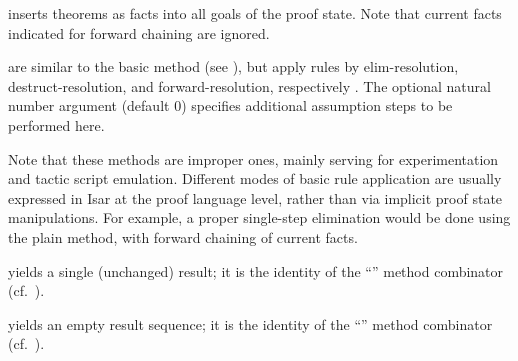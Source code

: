 \begin{isabellebody}
\begin{isamarkuptext}
\begin{descr}
  \item [\hyperlink{method.insert}{\mbox{\isa{insert}}}~\isa{{\isachardoublequote}a\isactrlsub {\isadigit{1}}\ {\isasymdots}\ a\isactrlsub n{\isachardoublequote}}] inserts
  theorems as facts into all goals of the proof state.  Note that
  current facts indicated for forward chaining are ignored.

  \item [\hyperlink{method.erule}{\mbox{\isa{erule}}}~\isa{{\isachardoublequote}a\isactrlsub {\isadigit{1}}\ {\isasymdots}\ a\isactrlsub n{\isachardoublequote}}, \hyperlink{method.drule}{\mbox{\isa{drule}}}~\isa{{\isachardoublequote}a\isactrlsub {\isadigit{1}}\ {\isasymdots}\ a\isactrlsub n{\isachardoublequote}}, and \hyperlink{method.frule}{\mbox{\isa{frule}}}~\isa{{\isachardoublequote}a\isactrlsub {\isadigit{1}}\ {\isasymdots}\ a\isactrlsub n{\isachardoublequote}}] are similar to the basic \hyperlink{method.rule}{\mbox{}}
  method (see ), but apply rules by
  elim-resolution, destruct-resolution, and forward-resolution,
  respectively \cite{isabelle-ref}.  The optional natural number
  argument (default 0) specifies additional assumption steps to be
  performed here.

  Note that these methods are improper ones, mainly serving for
  experimentation and tactic script emulation.  Different modes of
  basic rule application are usually expressed in Isar at the proof
  language level, rather than via implicit proof state manipulations.
  For example, a proper single-step elimination would be done using
  the plain \hyperlink{method.rule}{\mbox{}} method, with forward chaining of current
  facts.

  \item [\hyperlink{method.succeed}{\mbox{\isa{succeed}}}] yields a single (unchanged) result; it is
  the identity of the ``\isa{{\isachardoublequote}{\isacharcomma}{\isachardoublequote}}'' method combinator (cf.\
  ).

  \item [\hyperlink{method.fail}{\mbox{\isa{fail}}}] yields an empty result sequence; it is the
  identity of the ``\isa{{\isachardoublequote}{\isacharbar}{\isachardoublequote}}'' method combinator (cf.\
  ).

  \end{descr}


\end{isamarkuptext}
\end{isabellebody}
